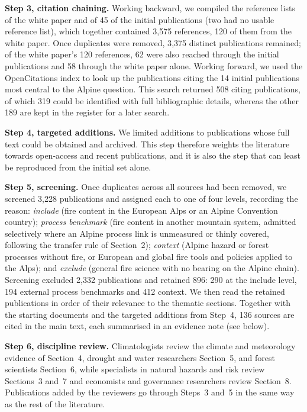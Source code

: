 \documentclass[11pt,a4paper]{article}
\begin{document}
\textbf{Step 3, citation chaining.} Working backward, we compiled the reference lists of the white paper and of 45 of the initial publications (two had no usable reference list), which together contained 3{,}575 references, 120 of them from the white paper. Once duplicates were removed, 3{,}375 distinct publications remained; of the white paper's 120 references, 62 were also reached through the initial publications and 58 through the white paper alone. Working forward, we used the OpenCitations index to look up the publications citing the 14 initial publications most central to the Alpine question. This search returned 508 citing publications, of which 319 could be identified with full bibliographic details, whereas the other 189 are kept in the register for a later search.

\textbf{Step 4, targeted additions.} We limited additions to publications whose full text could be obtained and archived. This step therefore weights the literature towards open-access and recent publications, and it is also the step that can least be reproduced from the initial set alone.

\textbf{Step 5, screening.} Once duplicates across all sources had been removed, we screened 3{,}228 publications and assigned each to one of four levels, recording the reason: \emph{include} (fire content in the European Alps or an Alpine Convention country); \emph{process benchmark} (fire content in another mountain system, admitted selectively where an Alpine process link is unmeasured or thinly covered, following the transfer rule of Section~2); \emph{context} (Alpine hazard or forest processes without fire, or European and global fire tools and policies applied to the Alps); and \emph{exclude} (general fire science with no bearing on the Alpine chain). Screening excluded 2{,}332 publications and retained 896: 290 at the include level, 194 external process benchmarks and 412 context. We then read the retained publications in order of their relevance to the thematic sections. Together with the starting documents and the targeted additions from Step~4, 136 sources are cited in the main text, each summarised in an evidence note (see below).

\textbf{Step 6, discipline review.} Climatologists review the climate and meteorology evidence of Section~4, drought and water researchers Section~5, and forest scientists Section~6, while specialists in natural hazards and risk review Sections~3 and~7 and economists and governance researchers review Section~8. Publications added by the reviewers go through Steps~3 and~5 in the same way as the rest of the literature.
\end{document}
